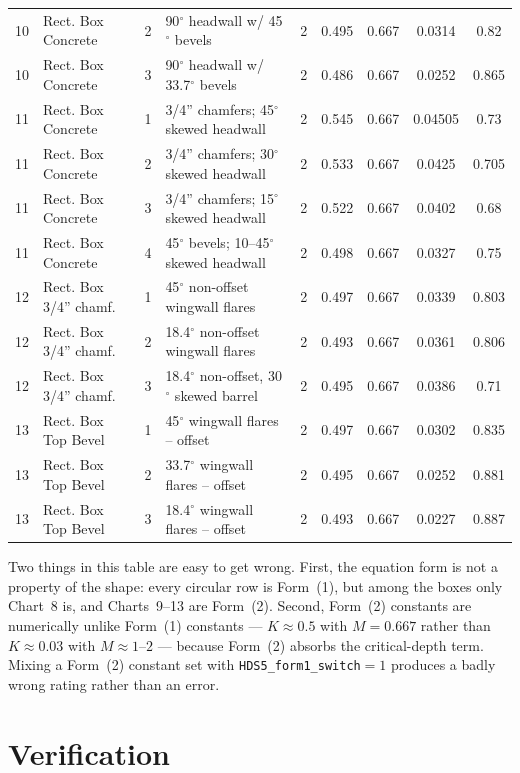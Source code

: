 \documentclass[11pt,a4paper]{article}
\newcommand{\code}[1]{\texttt{\small #1}}
\begin{document}
\begin{landscape}
\begin{longtable}{@{}clcp{}ccccc@{}}
10 & Rect. Box Concrete & 2 & 90$^\circ$ headwall w/ 45$^\circ$ bevels & 2 & 0.495 & 0.667 & 0.0314 & 0.82\\
10 & Rect. Box Concrete & 3 & 90$^\circ$ headwall w/ 33.7$^\circ$ bevels & 2 & 0.486 & 0.667 & 0.0252 & 0.865\\
11 & Rect. Box Concrete & 1 & 3/4'' chamfers; 45$^\circ$ skewed headwall & 2 & 0.545 & 0.667 & 0.04505 & 0.73\\
11 & Rect. Box Concrete & 2 & 3/4'' chamfers; 30$^\circ$ skewed headwall & 2 & 0.533 & 0.667 & 0.0425 & 0.705\\
11 & Rect. Box Concrete & 3 & 3/4'' chamfers; 15$^\circ$ skewed headwall & 2 & 0.522 & 0.667 & 0.0402 & 0.68\\
11 & Rect. Box Concrete & 4 & 45$^\circ$ bevels; 10--45$^\circ$ skewed headwall & 2 & 0.498 & 0.667 & 0.0327 & 0.75\\
12 & Rect. Box 3/4'' chamf. & 1 & 45$^\circ$ non-offset wingwall flares & 2 & 0.497 & 0.667 & 0.0339 & 0.803\\
12 & Rect. Box 3/4'' chamf. & 2 & 18.4$^\circ$ non-offset wingwall flares & 2 & 0.493 & 0.667 & 0.0361 & 0.806\\
12 & Rect. Box 3/4'' chamf. & 3 & 18.4$^\circ$ non-offset, 30$^\circ$ skewed barrel & 2 & 0.495 & 0.667 & 0.0386 & 0.71\\
13 & Rect. Box Top Bevel & 1 & 45$^\circ$ wingwall flares -- offset & 2 & 0.497 & 0.667 & 0.0302 & 0.835\\
13 & Rect. Box Top Bevel & 2 & 33.7$^\circ$ wingwall flares -- offset & 2 & 0.495 & 0.667 & 0.0252 & 0.881\\
13 & Rect. Box Top Bevel & 3 & 18.4$^\circ$ wingwall flares -- offset & 2 & 0.493 & 0.667 & 0.0227 & 0.887\\
\bottomrule
\end{longtable}
\endgroup
\end{landscape}

\noindent
Two things in this table are easy to get wrong. First, the equation form is not
a property of the shape: every circular row is Form~(1), but among the boxes
only Chart~8 is, and Charts~9--13 are Form~(2). Second, Form~(2) constants are
numerically unlike Form~(1) constants --- $K\approx0.5$ with $M=0.667$ rather
than $K\approx0.03$ with $M\approx1$--$2$ --- because Form~(2) absorbs the
critical-depth term. Mixing a Form~(2) constant set with
\code{HDS5\_form1\_switch}${}=1$ produces a badly wrong rating rather than an
error.

\section{Verification}\label{sec:verification}
\end{document}
